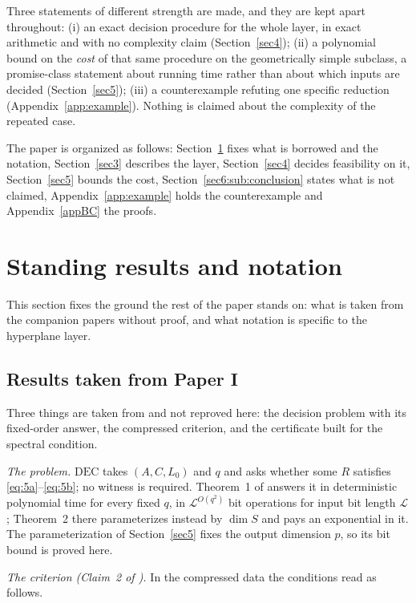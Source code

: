 \documentclass[journal]{IEEEtran}
\theoremstyle{plainn}
\theoremstyle{remark}
\begin{document}
Three statements of different strength are made, and they are kept apart throughout: (i) an exact
decision procedure for the whole layer, in exact arithmetic and with no complexity claim
(Section~\ref{sec4}); (ii) a polynomial bound on the \emph{cost} of that same procedure on the
geometrically simple subclass, a promise-class statement about running time rather than about which
inputs are decided (Section~\ref{sec5}); (iii) a counterexample refuting one specific reduction
(Appendix~\ref{app:example}). Nothing is claimed about the complexity of the repeated case.


The paper is organized as follows: Section~\ref{sec:prelim} fixes what is borrowed and the notation,
Section~\ref{sec3} describes the layer, Section~\ref{sec4} decides feasibility on it,
Section~\ref{sec5} bounds the cost, Section~\ref{sec6:sub:conclusion} states what is not claimed,
Appendix~\ref{app:example} holds the counterexample and Appendix~\ref{appBC} the proofs.

\section{Standing results and notation}\label{sec:prelim}

This section fixes the ground the rest of the paper stands on: what is taken from the companion
papers without proof, and what notation is specific to the hyperplane layer.

\subsection{Results taken from Paper I}\label{sec:prelim:criterion}

Three things are taken from \cite{companion1} and not reproved here: the decision problem with its
fixed-order answer, the compressed criterion, and the certificate built for the spectral condition.

\emph{The problem.} $\mathrm{DEC}$ takes $(A,C,L_0)$ and $q$ and asks whether some $R$ satisfies
\eqref{eq:5a}--\eqref{eq:5b}; no witness is required. Theorem~1 of \cite{companion1} answers it in
deterministic polynomial time for every fixed $q$, in $\mathcal L^{O(q^2)}$ bit operations for input
bit length $\mathcal L$; Theorem~2 there parameterizes instead by $\dim S$ and pays an exponential in
it. The parameterization of Section~\ref{sec5} fixes the output dimension $p$, so its bit bound is
proved here.

\emph{The criterion (Claim~2 of \cite{companion1}).} In the compressed data the conditions read as
follows.
\end{document}
